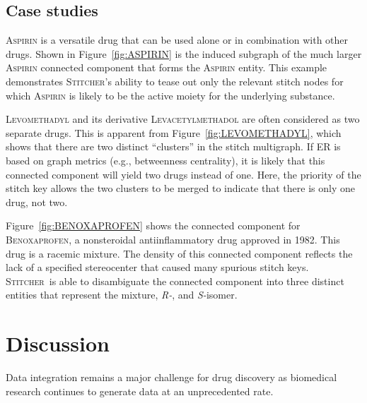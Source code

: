 \documentclass{bmcart}
\newcommand\st{\textsc{Stitcher}}
\begin{document}
\subsection*{Case studies}
\textsc{Aspirin} is a versatile drug that can be used alone or in
combination with other drugs. Shown in Figure~\ref{fig:ASPIRIN} is the
induced subgraph of the much larger \textsc{Aspirin} connected component that
forms the \textsc{Aspirin} entity. This example demonstrates \st's
ability to tease out only the relevant stitch nodes for which
\textsc{Aspirin} is likely to be the active moiety for the underlying
substance. 

\textsc{Levomethadyl} and its derivative \textsc{Levacetylmethadol} are
often considered as two separate drugs. This is apparent from
Figure~\ref{fig:LEVOMETHADYL}, which shows that there are two distinct
``clusters'' in the stitch multigraph. If ER is based on
graph metrics (e.g., betweenness centrality), it is likely that this
connected component will yield two drugs instead of one. Here, the
priority of the stitch key allows the two clusters to be merged to
indicate that there is only one drug, not two.

Figure~\ref{fig:BENOXAPROFEN} shows the connected component for
\textsc{Benoxaprofen}, a nonsteroidal antiinflammatory drug approved in
1982. This drug is a racemic mixture. The density of this connected
component reflects the lack of a specified stereocenter that
caused many spurious stitch keys. \st\ is able to disambiguate the
connected component into three distinct entities that represent the
mixture, \emph{R-}, and \emph{S-}isomer.

\section*{Discussion}
Data integration remains a major challenge for drug discovery as
biomedical research continues to generate data at an unprecedented
rate. 

\end{document}
